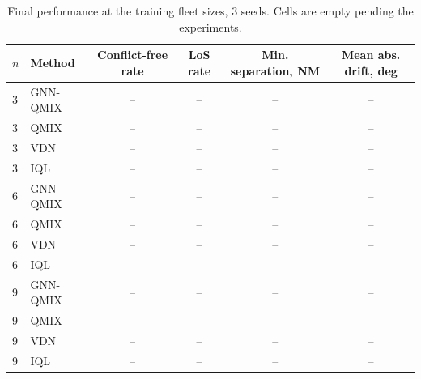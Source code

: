 \begin{table}[hbt!]
\caption{\label{tab:main} Final performance at the training fleet sizes, 3 seeds. Cells are
empty pending the experiments.}
\centering
\begin{tabular}{llcccc}
\hline
$n$ & Method & Conflict-free rate & LoS rate & Min. separation, NM & Mean abs. drift, deg \\
\hline
3 & GNN-QMIX & -- & -- & -- & -- \\
3 & QMIX     & -- & -- & -- & -- \\
3 & VDN      & -- & -- & -- & -- \\
3 & IQL      & -- & -- & -- & -- \\
\hline
6 & GNN-QMIX & -- & -- & -- & -- \\
6 & QMIX     & -- & -- & -- & -- \\
6 & VDN      & -- & -- & -- & -- \\
6 & IQL      & -- & -- & -- & -- \\
\hline
9 & GNN-QMIX & -- & -- & -- & -- \\
9 & QMIX     & -- & -- & -- & -- \\
9 & VDN      & -- & -- & -- & -- \\
9 & IQL      & -- & -- & -- & -- \\
\hline
\end{tabular}
\end{table}

